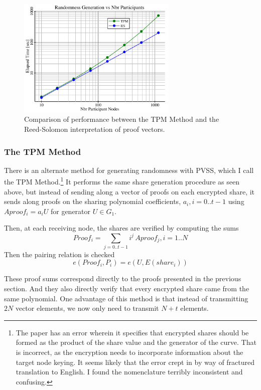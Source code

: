 \documentclass{yellowpaper}
\begin{document}
\begin{figure}[h!]
  \centering
  \includegraphics[width=3in]{randtimings}
  \caption{ Comparison of performance between the TPM Method and the Reed-Solomon interpretation of proof vectors.}
  \label{fig:randtimings}
\end{figure}


\subsubsection{The TPM Method}
There is an alternate method for generating randomness with PVSS, which I call the TPM Method.\cite{tpm}\footnote{The paper has an error wherein it specifies that encrypted shares should be formed as the product of the share value and the generator of the curve. That is incorrect, as the encryption needs to incorporate information about the target node keying. It seems likely that the error crept in by way of fractured translation to English. I found the nomenclature terribly inconsistent and confusing.} It performs the same share generation procedure as seen above, but instead of sending along a vector of proofs on each encrypted share, it sends along proofs on the sharing polynomial coefficients, $a_i, i = 0..t-1$ using $Aproof_i = a_i U$ for generator $U \in G_1$.

Then, at each receiving node, the shares are verified by computing the sums
$$ Proof_i = \sum_{j=0..t-1} i^j\, Aproof_j, i = 1..N$$
Then the pairing relation is checked
$$e(Proof_i, P_i) = e(U,E(share_i))$$

These proof sums correspond directly to the proofs presented in the previous section. And they also directly verify that every encrypted share came from the same polynomial. One advantage of this method is that instead of transmitting $2 N$ vector elements, we now only need to transmit $N+t$ elements.
\end{document}
